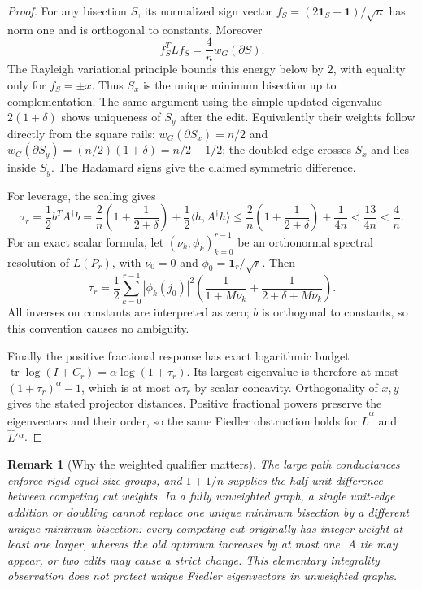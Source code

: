 \documentclass[11pt]{article}
\newtheorem{remark}[theorem]{Remark}
\newcommand{\one}{\boldsymbol 1}
\newcommand{\tr}{\operatorname{tr}}
\begin{document}
\begin{proof}
For any bisection $S$, its normalized sign vector
$f_S=(2\one_S-\one)/\sqrt n$ has norm one and is orthogonal to
constants. Moreover
\[
 f_S^T\widehat L f_S=\frac4n w_G(\partial S).
\]
The Rayleigh variational principle bounds this energy below by $2$,
with equality only for $f_S=\pm x$. Thus $S_x$ is the unique minimum
bisection up to complementation. The same argument using the simple
updated eigenvalue $2(1+\delta)$ shows uniqueness of $S_y$ after
the edit. Equivalently their weights follow directly from the square
rails: $w_G(\partial S_x)=n/2$ and
$w_G(\partial S_y)=(n/2)(1+\delta)=n/2+1/2$; the doubled edge
crosses $S_x$ and lies inside $S_y$.
The Hadamard signs give the claimed symmetric difference.

For leverage, the scaling gives
\[
 \tau_r=\frac12 b^TA^\dagger b
 =\frac2n\left(1+\frac1{2+\delta}\right)
        +\frac12\langle h,A^\dagger h\rangle
 \le\frac2n\left(1+\frac1{2+\delta}\right)+\frac1{4n}
 <\frac{13}{4n}<\frac4n.
\]
For an exact scalar formula, let $(\nu_k,\phi_k)_{k=0}^{r-1}$ be
an orthonormal spectral resolution of $L(P_r)$, with
$\nu_0=0$ and $\phi_0=\one_r/\sqrt r$. Then
\[
 \tau_r=\frac12\sum_{k=0}^{r-1}|\phi_k(j_0)|^2
 \left(\frac1{1+M\nu_k}+
       \frac1{2+\delta+M\nu_k}\right).
\]
All inverses on constants are interpreted as zero; $b$ is orthogonal
to constants, so this convention causes no ambiguity.

Finally the positive fractional response has exact logarithmic budget
$\tr\log(I+C_r)=\alpha\log(1+\tau_r)$. Its largest eigenvalue is
therefore at most $(1+\tau_r)^\alpha-1$, which is at most
$\alpha\tau_r$ by scalar concavity. Orthogonality of $x,y$ gives
the stated projector distances. Positive fractional powers preserve
the eigenvectors and their order, so the same Fiedler obstruction
holds for $\widehat L^\alpha$ and $\widehat L'{}^\alpha$.
\end{proof}

\begin{remark}[Why the weighted qualifier matters]
The large path conductances enforce rigid equal-size groups, and
$1+1/n$ supplies the half-unit difference between competing cut
weights. In a fully unweighted graph, a single unit-edge addition
or doubling cannot replace one unique minimum bisection by a
different unique minimum bisection: every competing cut originally
has integer weight at least one larger, whereas the old optimum
increases by at most one. A tie may appear, or two edits may cause
a strict change. This elementary integrality observation does not
protect unique Fiedler eigenvectors in unweighted graphs.
\end{remark}
\end{document}
